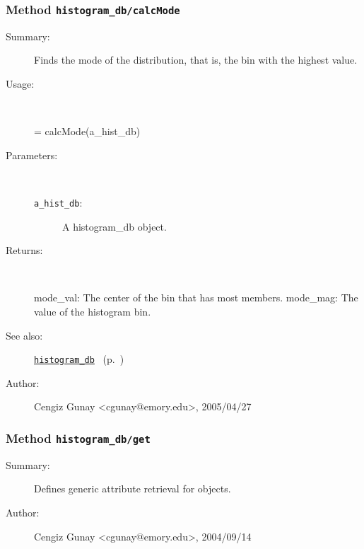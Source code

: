 \subsubsection[Method \texttt{calcMode}]{Method \texttt{histogram\_db/calcMode}}%
%
\label{ref_histogram_db__calcMode}%
\hypertarget{ref_histogram_db__calcMode}{}%
\begin{description}
\item[Summary:]Finds the mode of the distribution, that is, the bin with the highest value.
%
\item[Usage:]~%
\begin{lyxcode}%
[mode\_val, mode\_mag] = calcMode(a\_hist\_db)
%
\end{lyxcode}%
%
%
\item[Parameters:]~
\begin{description}%
\item[\texttt{a\_hist\_db}:]
 A histogram\_db object.
\end{description}%
%
\item[Returns:
]~

	mode\_val: The center of the bin that has most members.
	mode\_mag: The value of the histogram bin.
%
%
\item[See also:]%
\hyperlink{ref_histogram_db}{\texttt{histogram\_db}}%
\ (p.~\pageref{ref_histogram_db})%
%
%
\item[Author:]%
Cengiz Gunay <cgunay@emory.edu>, 2005/04/27
%
\end{description}
\methodline%
\subsubsection[Method \texttt{get}]{Method \texttt{histogram\_db/get}}%
%
\label{ref_histogram_db__get}%
\hypertarget{ref_histogram_db__get}{}%
\begin{description}
\item[Summary:]Defines generic attribute retrieval for objects.
%
%
%
%
%
%
%
\item[Author:]%
Cengiz Gunay <cgunay@emory.edu>, 2004/09/14
%
\end{description}
\methodline%
